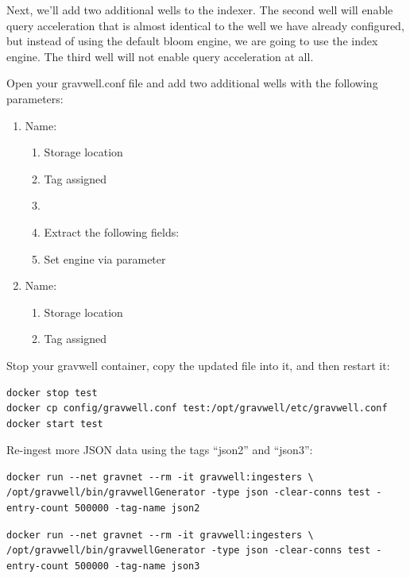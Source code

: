 {\clearpage
Next, we'll add two additional wells to the indexer.
The second well will enable query acceleration that is almost identical
to the well we have already configured, but instead of using the default
bloom engine, we are going to use the index engine. The third well will
not enable query acceleration at all.

Open your gravwell.conf file and add two additional wells with the
following parameters:

\begin{enumerate}
	\item Name: 
	\begin{enumerate}
		\item Storage location 
		\item Tag  assigned
		\item {}
		\item Extract the following fields: 
		\item Set engine via  parameter
	\end{enumerate}
	\item Name: 
	\begin{enumerate}
		\item Storage location 
		\item Tag  assigned
	\end{enumerate}
\end{enumerate}

Stop your gravwell container, copy the updated  file
into it, and then restart it:

\begin{Verbatim}[breaklines=true]
docker stop test
docker cp config/gravwell.conf test:/opt/gravwell/etc/gravwell.conf
docker start test
\end{Verbatim}

Re-ingest more JSON data using the tags ``json2'' and
``json3'':}

\begin{Verbatim}[breaklines=true]
docker run --net gravnet --rm -it gravwell:ingesters \
/opt/gravwell/bin/gravwellGenerator -type json -clear-conns test -entry-count 500000 -tag-name json2
\end{Verbatim}

\begin{Verbatim}[breaklines=true]
docker run --net gravnet --rm -it gravwell:ingesters \
/opt/gravwell/bin/gravwellGenerator -type json -clear-conns test -entry-count 500000 -tag-name json3
\end{Verbatim}

